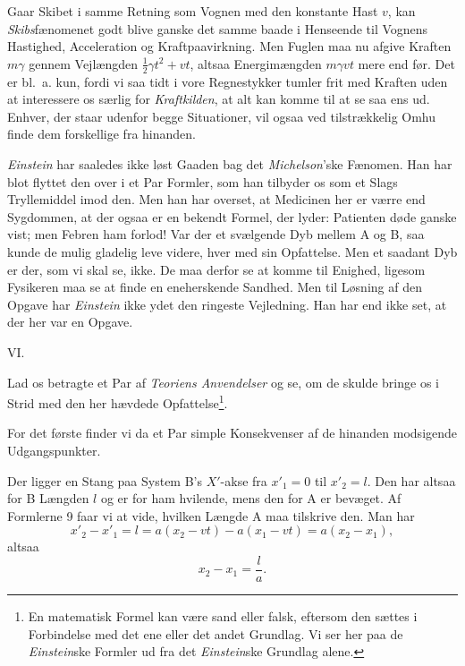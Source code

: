 \documentclass[12pt,a4paper]{article}
\newcommand{\opage}[1]{\marginnote{\footnotesize\textit{[#1]}}}
\begin{document}
Gaar Skibet i samme Retning som Vognen med den konstante Hast $v$, kan
\emph{Skibs}fænomenet godt blive ganske det samme baade i Henseende til
Vognens Hastighed, Acceleration og Kraftpaavirkning. Men Fuglen maa nu
afgive Kraften $m\gamma$ gennem Vejlængden
$\tfrac{1}{2}\gamma t^{2} + vt$, altsaa Energimængden $m\gamma vt$ mere end
før. Det er bl.\ a. kun, fordi vi saa tidt i vore Regnestykker tumler frit
med Kraften uden at interessere os særlig for \emph{Kraftkilden}, at alt
kan komme til at se saa ens ud. Enhver, der staar udenfor begge
Situationer, vil ogsaa ved tilstrækkelig Omhu finde dem forskellige fra
hinanden.

\emph{Einstein} har saaledes ikke løst Gaaden bag det
\emph{Michelson}'ske Fænomen. Han har blot flyttet den over i et Par
Formler, som han tilbyder os som et Slags Tryllemiddel imod den. Men han
har overset, at Medicinen her er værre end Sygdommen, at der ogsaa er en
bekendt Formel, der lyder: Patienten døde ganske vist; men Febren ham
forlod! Var der et svælgende Dyb mellem A og B, saa kunde de mulig gladelig
leve videre, hver med sin Opfattelse. Men et saadant Dyb er der, som vi
skal se, ikke. De maa derfor se at komme til Enighed, ligesom Fysikeren maa
se at finde en eneherskende Sandhed. Men til Løsning af den Opgave har
\emph{Einstein}
\opage{20} ikke ydet den ringeste Vejledning. Han har end ikke set, at der her var en
Opgave.

\begin{center}
VI.
\end{center}

Lad os betragte et Par af \emph{Teoriens Anvendelser} og se, om de skulde
bringe os i Strid med den her hævdede Opfattelse\footnote{En matematisk
Formel kan være sand eller falsk, eftersom den sættes i Forbindelse med det
ene eller det andet Grundlag. Vi ser her paa de \emph{Einstein}ske Formler
ud fra det \emph{Einstein}ske Grundlag alene.}.

For det første finder vi da et Par simple Konsekvenser af de hinanden
modsigende Udgangspunkter.

Der ligger en Stang paa System B's $X'$-akse fra $x'_{1} = 0$ til
$x'_{2} = l$. Den har altsaa for B Længden $l$ og er for ham hvilende, mens
den for A er bevæget. Af Formlerne 9 faar vi at vide, hvilken Længde A maa
tilskrive den. Man har
\[
  x'_{2} - x'_{1} = l = a(x_{2} - vt) - a(x_{1} - vt) = a(x_{2} - x_{1}),
\]
altsaa
\[
  x_{2} - x_{1} = \frac{l}{a}.
\]
\end{document}
